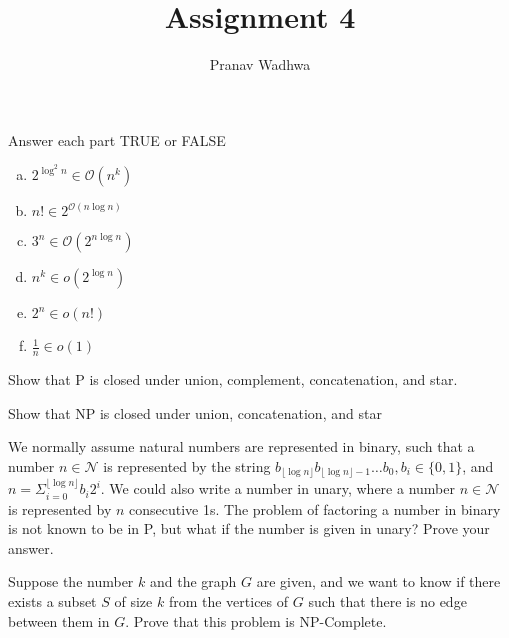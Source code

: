 \documentclass[12pt]{exam}
\title{
  Assignment 4
}
\author{Pranav Wadhwa}
\begin{document}
\maketitle
\noindent


\begin{questions}

  \question{}
  Answer each part TRUE or FALSE

  \begin{multicols}{2}
  \begin{enumerate}[a.]

    \item $2^{\log^{2}n}\in \mathcal{O}(n^{k})$
    \item $n!\in 2^{\mathcal{O}(n\log n)}$
    \item $3^{n}\in \mathcal{O}(2^{n\log n})$
    \item $n^{k}\in o(2^{\log n})$
    \item $2^{n}\in o(n!)$
    \item $\frac{1}{n} \in o(1)$

  \end{enumerate}
  \end{multicols}


  \question{} %

  Show that P is closed under union, complement, concatenation, and star.


  \question{} %

  Show that NP is closed under union, concatenation, and star

  \question{} %

  We normally assume natural numbers are represented in binary, such that a number $n\in \mathcal{N}$ is represented by the string $b_{\lfloor\log n \rfloor}b_{\lfloor \log n \rfloor - 1} \dots b_{0}, b_{i} \in \{0,1\}$, and $n=\Sigma^{\lfloor \log n \rfloor}_{i=0}b_{i}2^{i}$.
  We could also write a number in unary, where a number $n\in \mathcal{N}$ is represented by $n$ consecutive 1s.
  The problem of factoring a number in binary is not known to be in P, but what if the number is given in unary?
  Prove your answer.


  \question{} %

  Suppose the number $k$ and the graph $G$ are given, and we want to know if there exists a subset $S$ of size $k$ from the vertices of $G$ such that there is no edge between them in $G$.
  Prove that this problem is NP-Complete.


  \question{} %


\end{questions}
\end{document}
